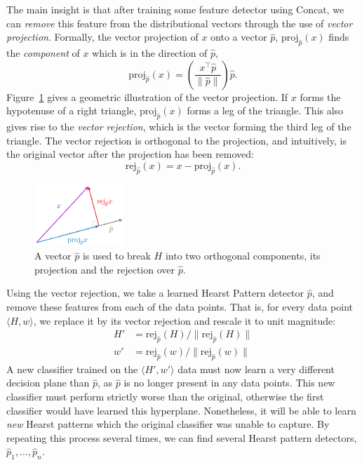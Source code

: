 \documentclass[12pt]{article}
\begin{document}
The main insight is that after training some feature detector using Concat,
we can {\em remove} this feature from the distributional vectors through
the use of {\em vector projection}.
Formally, the vector projection of $x$ onto
a vector $\hat p$, $\text{proj}_{\hat p}(x)$ finds the {\em component} of $x$
which is in the direction of $\hat p$,
\begin{equation*}
  \text{proj}_{\hat p}(x) = \left(\frac{x^\top\hat p}{\|\hat p\|}\right)\hat p.
\end{equation*}
Figure~\ref{fig:vecproj} gives a geometric illustration of the vector
projection. If $x$ forms the hypotenuse of a right
triangle, $\text{proj}_{\hat p}(x)$ forms a leg of the triangle. This also
gives rise to the {\em vector rejection}, which is the vector forming the third
leg of the triangle. The vector rejection is orthogonal to the projection, and
intuitively, is the original vector after the projection has been removed:
\begin{equation*}
  \text{rej}_{\hat p}(x) = x - \text{proj}_{\hat p}(x).
\end{equation*}

\begin{figure}
  \begin{center}
  \includegraphics[width=0.30\textwidth]{figures/vecproj}
\end{center}
\caption{A vector $\hat p$ is used to break $H$ into two orthogonal components,
its projection and the rejection over $\hat p$.}
\label{fig:vecproj}
\end{figure}

Using the vector rejection, we take a learned Hearst Pattern detector $\hat p$,
and remove these features from each of the data points. That is, for every data
point $\langle H, w\rangle$, we replace it by its vector rejection and rescale
it to unit magnitude:
\begin{align*}
  H' & = \text{rej}_{\hat p}(H) / \|\text{rej}_{\hat p}(H)\|\\
  w' & = \text{rej}_{\hat p}(w) / \|\text{rej}_{\hat p}(w)\|
\end{align*}
A new classifier trained on the $\langle H', w'\rangle$ data must now learn
a very different decision plane than $\hat p$, as $\hat p$ is no longer present
in any data points. This new classifier must perform strictly worse than the
original, otherwise the first classifier would have learned this hyperplane.
Nonetheless, it will be able to learn {\em new} Hearst patterns which the
original classifier was unable to capture. By repeating this process several
times, we can find several Hearst pattern detectors, $\hat p_1, \ldots, \hat
p_n$.
\end{document}
